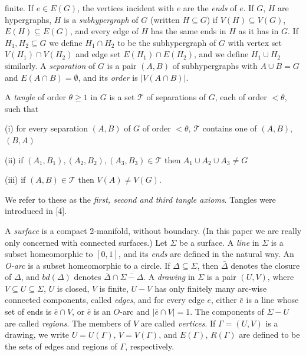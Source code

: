 \noindent finite. If $e \in E(G)$, the vertices incident with $e$ are the \textit{ends} of $e$. If $G$, $H$ are hypergraphs, $H$ is a \textit{subhypergraph} of $G$ (written $H \subseteq G$) if $V(H) \subseteq V(G)$, $E(H) \subseteq E(G)$, and every edge of $H$ has the same ends in $H$ as it has in $G$. If $H_1, H_2 \subseteq G$ we define $H_1 \cap H_2$ to be the subhypergraph of $G$ with vertex set $V(H_1) \cap V(H_2)$ and edge set $E(H_1) \cap E(H_2)$, and we define $H_1 \cup H_2$ similarly. A \textit{separation} of $G$ is a pair $(A, B)$ of subhypergraphs with $A \cup B = G$ and $E(A \cap B) = \emptyset$, and its \textit{order} is $|V(A \cap B)|$.

A \textit{tangle} of order $\theta \ge 1$ in $G$ is a set $\mathscr{T}$ of separations of $G$, each of order $< \theta$, such that

\hspace*{12pt}(i) for every separation $(A, B)$ of $G$ of order $< \theta$, $\mathscr{T}$ contains one of $(A, B)$, $(B, A)$

\hspace*{12pt}(ii) if $(A_1, B_1), (A_2, B_2), (A_3, B_3) \in \mathscr{T}$ then $A_1 \cup A_2 \cup A_3 \ne G$

\hspace*{12pt}(iii) if $(A, B) \in \mathscr{T}$ then $V(A) \ne V(G)$.

We refer to these as the \textit{first, second and third tangle axioms}. Tangles were introduced in [4].


A \textit{surface} is a compact 2-manifold, without boundary. (In this paper we are really only concerned with connected surfaces.) Let $\Sigma$ be a surface. A \textit{line} in $\Sigma$ is a subset homeomorphic to $[0, 1]$, and its \textit{ends} are defined in the natural way. An \textit{O-arc} is a subset homeomorphic to a circle. If $\Delta \subseteq \Sigma$, then $\bar{\Delta}$ denotes the closure of $\Delta$, and $bd(\Delta)$ denotes $\bar{\Delta} \cap \overline{\Sigma - \Delta}$. A \textit{drawing} in $\Sigma$ is a pair $(U, V)$, where $V \subseteq U \subseteq \Sigma$, $U$ is closed, $V$ is finite, $U - V$ has only finitely many arc-wise connected components, called \textit{edges}, and for every edge $e$, either $\bar{e}$ is a line whose set of ends is $\bar{e} \cap V$, or $\bar{e}$ is an $O$-arc and $|\bar{e} \cap V| = 1$. The components of $\Sigma - U$ are called \textit{regions}. The members of $V$ are called \textit{vertices}. If $\Gamma = (U, V)$ is a drawing, we write $U = U(\Gamma)$, $V = V(\Gamma)$, and $E(\Gamma)$, $R(\Gamma)$ are defined to be the sets of edges and regions of $\Gamma$, respectively.


